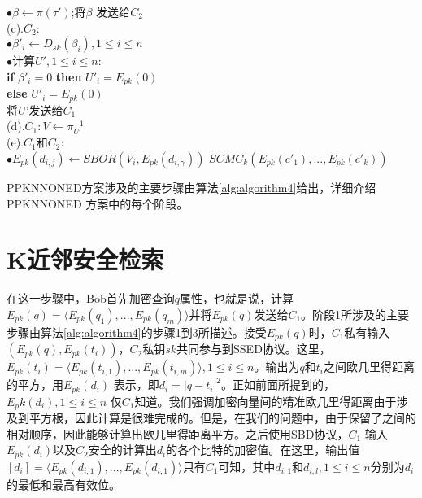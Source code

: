 \begin{algorithm}[H]
\begin{algorithmic}[1]
    \hspace{1cm}$\bullet \beta \leftarrow \pi(\tau')$;将$\beta$ 发送给$C_2$\\
     \hspace{0.6cm}(c).\hspace{0.1cm}$C_2:$\\
     \hspace{1cm} $\bullet \beta'_i \leftarrow D_{sk}(\beta_i),1 \leq i \leq n$\\
     \hspace{1cm} $\bullet$计算$U',1 \leq i \leq n$:\\
     \hspace{1.5cm} \textbf{if} $\beta'_i=0$ \textbf{then} $U'_i=E_{pk}(0)$\\
     \hspace{1.5cm} \textbf{else} $U'_i = E_{pk}(0)$\\
     \hspace{1cm} 将$U’$发送给$C_1$\\
     \hspace{0.6cm}(d).\hspace{0.1cm}$C_1: V \leftarrow \pi^{-1}_{U'}$\\
     \hspace{0.6cm}(e).\hspace{0.1cm}$C_1$和$C_2$:\\
      \hspace{1cm} $\bullet E_{pk}(d_{i,j})\leftarrow SBOR(V_i,E_{pk}(d_{i,\gamma}))$
      \State $SCMC_k(E_{pk}(c'_1),...,E_{pk}(c'_k))$
\end{algorithmic}
\end{algorithm}

PPKNNONED方案涉及的主要步骤由算法\ref{alg:algorithm4}给出，详细介绍PPKNNONED 方案中的每个阶段。
\section{K近邻安全检索}
在这一步骤中，Bob首先加密查询$q$属性，也就是说，计算$E_{pk}(q)=\langle E_{pk}(q_1),...,E_{pk}(q_m)\rangle$并将$E_{pk}(q)$发送给$C_1$。阶段1所涉及的主要步骤由算法\ref{alg:algorithm4}的步骤1到3所描述。接受$E_{pk}(q)$时，$C_1$私有输入$(E_{pk}(q),E_{pk}(t_i))$，$C_2$私钥$sk$共同参与到SSED协议。这里，$E_{pk}(t_i)=\langle E_{pk}(t_{i,1}),...,E_{pk}(t_{i,m})\rangle,1 \leq i \leq n$。输出为$q$和$t_i$之间欧几里得距离的平方，用$E_{pk}(d_i)$ 表示，即$d_i =|q-t_i|^2$。正如前面所提到的，$E_pk(d_i),1 \leq i \leq n$ 仅$C_1$知道。我们强调加密向量间的精准欧几里得距离由于涉及到平方根，因此计算是很难完成的。但是，在我们的问题中，由于保留了之间的相对顺序，因此能够计算出欧几里得距离平方。之后使用SBD协议，$C_1$ 输入$E_{pk}(d_i)$以及$C_2$安全的计算出$d_i$的各个比特的加密值。在这里，输出值$[d_i]=\langle E_{pk}(d_{i,1}),...,E_{pk}(d_{i,1})\rangle$只有$C_1$可知，其中$d_{i,1}$和$d_{i,l},1 \leq i \leq n$分别为$d_i$的最低和最高有效位。

